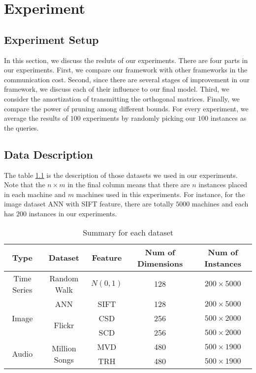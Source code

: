 \chapter{Experiment}
\label{c:exp}

\section{Experiment Setup} %
\label{s:experiment_setup}

In this section, we discuss the resluts of our experiments.  There are four parts in our experiments.  First, we compare our framework with other frameworks in the communication cost.  Second, since there are several stages of improvement in our framework, we discuss each of their influence to our final model.  Third, we consider the amortization of transmitting the orthogonal matrices.  Finally, we compare the power of pruning among different bounds.  For every experiment, we average the results of $100$ experiments by randomly picking our $100$ instances as the queries.

\section{Data Description} %
\label{s:data_description}

The table \ref{table:datasets} is the description of those datasets we used in our experiments. Note that the $n\times m$ in the final column means that there are $n$ instances placed in each machine and $m$ machines used in this experiments.  For instance, for the image dataset ANN with SIFT feature, there are totally $5000$ machines and each has $200$ instances in our experiments.

\begin{table}[htpb]\begin{center}
\caption{Summary for each dataset}\label{table:datasets}
\begin{tabular}{|c|c|c|c|c|}
\hline 
Type & Dataset & Feature & Num of Dimensions & Num of Instances\\ \hline \hline
Time Series & Random Walk & $N(0,1)$ & 128 & $200\times 5000$\\ \hline
\multirow{3}{*}{Image} & ANN & SIFT & 128 & $200\times 5000$\\ 
\cline{2-5}
 & \multirow{2}{*}{Flickr} & CSD & 256 & $500\times 2000$\\ 
 & & SCD & 256 & $500\times 2000$\\ \hline
 \multirow{2}{*}{Audio} & \multirow{2}{*}{Million Songs} & MVD & 480 & $500\times 1900$ \\ 
 \cline{3-5}
 & & TRH & 480 & $500\times 1900$\\ \hline
\end{tabular}
\end{center}\end{table}

